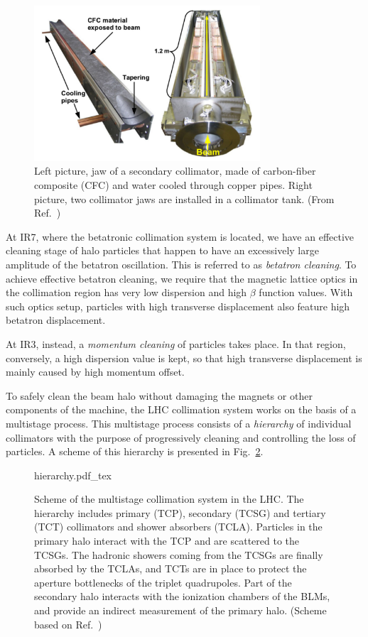 \begin{figure}[hpt]
    \centering
    \includegraphics[width=0.75\textwidth]{5_Diffusion_measurement_LHC/figs/collimator_pics.png}
    \caption{Left picture, jaw of a secondary collimator, made of carbon-fiber composite (CFC) and water cooled through copper pipes. Right picture, two collimator jaws are installed in a collimator tank. (From Ref.~\cite{bruce2014simulations})}
    \label{fig:collimator_pics}
\end{figure}

At IR7, where the betatronic collimation system is located, we have an effective cleaning stage of halo particles that happen to have an excessively large amplitude of the betatron oscillation. This is referred to as \textit{betatron cleaning}. To achieve effective betatron cleaning, we require that the magnetic lattice optics in the collimation region has very low dispersion and high $\beta$ function values. With such optics setup, particles with high transverse displacement also feature high betatron displacement.

At IR3, instead, a \textit{momentum cleaning} of particles takes place. In that region, conversely, a high dispersion value is kept, so that high transverse displacement is mainly caused by high momentum offset.

To safely clean the beam halo without damaging the magnets or other components of the machine, the LHC collimation system works on the basis of a multistage process. This multistage process consists of a \textit{hierarchy} of individual collimators with the purpose of progressively cleaning and controlling the loss of particles. A scheme of this hierarchy is presented in Fig.~\ref{fig:collimator_hierarchy}.

\begin{figure}[hpt]
    \centering
    \def\svgwidth{1.0\columnwidth}
    {hierarchy.pdf_tex}
    \caption{Scheme of the multistage collimation system in the LHC. The hierarchy includes primary (TCP), secondary (TCSG) and tertiary (TCT) collimators and shower absorbers (TCLA). Particles in the primary halo interact with the TCP and are scattered to the TCSGs. The hadronic showers coming from the TCSGs are finally absorbed by the TCLAs, and TCTs are in place to protect the aperture bottlenecks of the triplet quadrupoles. Part of the secondary halo interacts with the ionization chambers of the BLMs, and provide an indirect measurement of the primary halo. (Scheme based on Ref.~\cite{Hermes:2241364})}
    \label{fig:collimator_hierarchy}
\end{figure}

